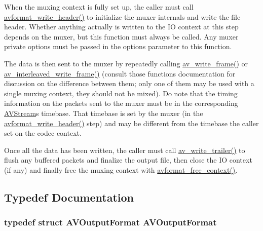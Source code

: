 When the muxing context is fully set up, the caller must call \hyperlink{group__lavf__encoding_ga78d4e734fecb1d2385536e6dd5b7b9f5}{avformat\+\_\+write\+\_\+header()} to initialize the muxer internals and write the file header. Whether anything actually is written to the IO context at this step depends on the muxer, but this function must always be called. Any muxer private options must be passed in the options parameter to this function.

The data is then sent to the muxer by repeatedly calling \hyperlink{group__lavf__encoding_gaa85cc1774f18f306cd20a40fc50d0b36}{av\+\_\+write\+\_\+frame()} or \hyperlink{group__lavf__encoding_ga37352ed2c63493c38219d935e71db6c1}{av\+\_\+interleaved\+\_\+write\+\_\+frame()} (consult those functions\textquotesingle{} documentation for discussion on the difference between them; only one of them may be used with a single muxing context, they should not be mixed). Do note that the timing information on the packets sent to the muxer must be in the corresponding \hyperlink{struct_a_v_stream}{A\+V\+Stream}\textquotesingle{}s timebase. That timebase is set by the muxer (in the \hyperlink{group__lavf__encoding_ga78d4e734fecb1d2385536e6dd5b7b9f5}{avformat\+\_\+write\+\_\+header()} step) and may be different from the timebase the caller set on the codec context.

Once all the data has been written, the caller must call \hyperlink{group__lavf__encoding_ga7f14007e7dc8f481f054b21614dfec13}{av\+\_\+write\+\_\+trailer()} to flush any buffered packets and finalize the output file, then close the IO context (if any) and finally free the muxing context with \hyperlink{group__lavf__core_gac2990b13b68e831a408fce8e1d0d6445}{avformat\+\_\+free\+\_\+context()}. 

\subsection{Typedef Documentation}
\subsubsection[{\texorpdfstring{A\+V\+Output\+Format}{AVOutputFormat}}]{\setlength{\rightskip}{0pt plus 5cm}typedef struct {\bf A\+V\+Output\+Format}  {\bf A\+V\+Output\+Format}}\hypertarget{group__lavf__encoding_ga7328f2fe9ea40f836f0eea2d44f2db5e}{}\label{group__lavf__encoding_ga7328f2fe9ea40f836f0eea2d44f2db5e}


